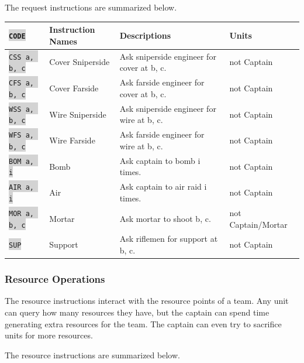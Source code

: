 \documentclass{article}
\newcommand{\vnscode}[1]{\colorbox{lightgray}{\lstinline[language=vns]{#1}}}
\begin{document}
The request instructions are summarized below.

\begin{minipage}{\textwidth}
\label{table:request}
\centering
\begin{tabular}{llll}
    \hline \vnscode{CODE} & Instruction Names & Descriptions & Units \\ \hline
    \vnscode{CSS a, b, c} & Cover Sniperside & Ask sniperside engineer for cover at b, c. & not Captain \\
    \vnscode{CFS a, b, c} & Cover Farside & Ask farside engineer for cover at b, c. & not Captain \\
    \vnscode{WSS a, b, c} & Wire Sniperside & Ask sniperside engineer for wire at b, c. & not Captain \\
    \vnscode{WFS a, b, c} & Wire Farside & Ask farside engineer for wire at b, c. & not Captain \\
    \vnscode{BOM a, i} & Bomb & Ask captain to bomb i times. & not Captain \\
    \vnscode{AIR a, i} & Air & Ask captain to air raid i times. & not Captain \\
    \vnscode{MOR a, b, c} & Mortar & Ask mortar to shoot b, c. & not Captain/Mortar \\
    \vnscode{SUP} & Support & Ask riflemen for support at b, c. & not Captain \\
\end{tabular}
\end{minipage}

\subsubsection{Resource Operations} %

The resource instructions interact with the resource points of a team. Any unit
can query how many resources they have, but the captain can spend time
generating extra resources for the team. The captain can even try to sacrifice
units for more resources.

The resource instructions are summarized below.
\end{document}
